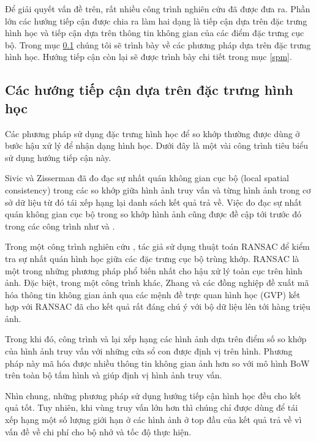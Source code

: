 Để giải quyết vấn đề trên, rất nhiều công trình nghiên cứu đã được đưa ra. Phần lớn các hướng tiếp cận được chia ra làm hai dạng là tiếp cận dựa trên đặc trưng hình học và tiếp cận dựa trên thông tin không gian của các điểm đặc trưng cục bộ. Trong mục \ref{geometry} chúng tôi sẽ trình bày về các phương pháp dựa trên đặc trưng hình học. Hướng tiếp cận còn lại sẽ được trình bày chi tiết trong mục \ref{spm}.

\subsection{Các hướng tiếp cận dựa trên đặc trưng hình học}
\label{geometry}
Các phương pháp sử dụng đặc trưng hình học để so khớp thường được dùng ở bước hậu xử lý để nhận dạng hình học. Dưới đây là một vài công trình tiêu biểu sử dụng hướng tiếp cận này.

Sivic và Zisserman \cite{sivic2003video} đã đo đạc sự nhất quán không gian cục bộ (local spatial consistency) trong các so khớp giữa hình ảnh truy vấn và từng hình ảnh trong cơ sở dữ liệu từ đó tái xếp hạng lại danh sách kết quả trả về. Việc đo đạc sự nhất quán không gian cục bộ trong so khớp hình ảnh cũng được đề cập tới trước đó trong các công trình như \cite{zhang1995robust} và \cite{schmid1997local}.

Trong một công trình nghiên cứu \cite{philbin2007object}, tác giả sử dụng thuật toán RANSAC \cite{fischler1981random} để kiểm tra sự nhất quán hình học giữa các đặc trưng cục bộ trùng khớp. RANSAC là một trong những phương pháp phổ biến nhất cho hậu xử lý toàn cục trên hình ảnh. Đặc biệt, trong một công trình khác, Zhang và các đồng nghiệp \cite{zhang2011image} đề xuất mã hóa thông tin không gian ảnh qua các mệnh đề trực quan hình học (GVP) kết hợp với RANSAC đã cho kết quả rất đáng chú ý với bộ dữ liệu lên tới hàng triệu ảnh.

Trong khi đó, công trình \cite{lin2010local} và \cite{lampert2009detecting} lại xếp hạng các hình ảnh dựa trên điểm số so khớp của hình ảnh truy vấn với những cửa sổ con được định vị trên hình. Phương pháp này mã hóa được nhiều thông tin không gian ảnh hơn so với mô hình BoW trên toàn bộ tấm hình và giúp định vị hình ảnh truy vấn.

Nhìn chung, những phương pháp sử dụng hướng tiếp cận hình học đều cho kết quả tốt. Tuy nhiên, khi vùng truy vấn lớn hơn thì chúng chỉ được dùng để tái xếp hạng một số lượng giới hạn ở các hình ảnh ở top đầu của kết quả trả về vì vấn đề về chi phí cho bộ nhớ và tốc độ thực hiện.

